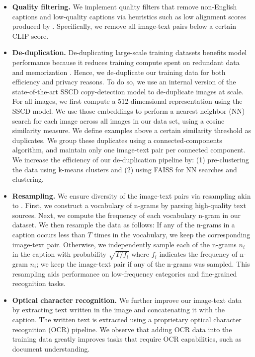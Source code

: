 \documentclass[dvipsnames]{fairmeta}
\begin{document}
\begin{itemize}

\item \textbf{Quality filtering.} We implement quality filters that remove non-English captions and low-quality captions via heuristics such as low alignment scores produced by \citep{radford2021learning}.
Specifically, we remove all image-text pairs below a certain CLIP score.

\item \textbf{De-duplication.} De-duplicating large-scale training datasets benefits model performance because it reduces training compute spent on redundant data \citep{esser2024scaling,lee2021deduplicating,abbas2023semdedup} and memorization \citep{carlini2023extracting,somepalli2023diffusion}.
Hence, we de-duplicate our training data for both efficiency and privacy reasons.
To do so, we use an internal version of the state-of-the-art SSCD copy-detection model \citep{pizzi2022self} to de-duplicate images at scale.
For all images, we first compute a 512-dimensional representation using the SSCD model.
We use those embeddings to perform a nearest neighbor (NN) search for each image across all images in our data set, using a cosine similarity measure.
We define examples above a certain similarity threshold as duplicates.
We group these duplicates using a connected-components algorithm, and maintain only one image-text pair per connected component.
We increase the efficiency of our de-duplication pipeline by: (1) pre-clustering the data using k-means clusters and (2) using FAISS \citep{johnson2019billion} for NN searches and clustering.

\item \textbf{Resampling.} We ensure diversity of the image-text pairs via resampling akin to \citet{xu2023demystifying,Mahajan_2018_ECCV,mikolov2013efficient}.
First, we construct a vocabulary of n-grams by parsing high-quality text sources.
Next, we compute the frequency of each vocabulary n-gram in our dataset.
We then resample the data as follows:
If any of the n-grams in a caption occurs less than $T$ times in the vocabulary, we keep the corresponding image-text pair.
Otherwise, we independently sample each of the n-grams $n_i$ in the caption with probability $\sqrt{T / f_i}$ where $f_i$ indicates the frequency of n-gram $n_i$; we keep the image-text pair if any of the n-grams was sampled.
This resampling aids performance on low-frequency categories and fine-grained recognition tasks.

\item \textbf{Optical character recognition.} We further improve our image-text data by extracting text written in the image and concatenating it with the caption.
The written text is extracted using a proprietary optical character recognition (OCR) pipeline.
We observe that adding OCR data into the training data greatly improves tasks that require OCR capabilities, such as document understanding.

\end{itemize}
\end{document}
